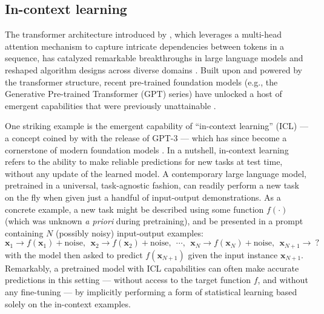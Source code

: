 \documentclass[english]{article}
\begin{document}
\subsection{In-context learning}

The transformer architecture introduced by \citet{vaswani2017attention}, which leverages a multi-head attention mechanism to capture intricate dependencies between tokens in a sequence, has catalyzed remarkable breakthroughs in large language models and reshaped algorithm designs across diverse domains \citep{khan2022transformers,shamshad2023transformers,lin2022survey,gillioz2020overview}.  Built upon and powered by the transformer structure, recent pre-trained foundation models (e.g., the Generative Pre-trained Transformer (GPT) series)  have unlocked a host of emergent capabilities that were previously unattainable  \citep{bommasani2021opportunities}. 


One striking example is the emergent capability of ``in-context learning'' (ICL) --- a concept coined by \cite{brown2020language} with the release of GPT-3 --- which has since become a cornerstone of modern foundation models \citep{dong2022survey}. 
In a nutshell, in-context learning refers to the ability to make reliable predictions for new tasks at test time,  without any update of the learned model. A contemporary large language model, pretrained in a universal, task-agnostic fashion, can readily perform a new task on the fly when given just a handful of input-output demonstrations.  As a concrete example, a new task might be described using some function $f(\cdot)$ (which was unknown {\em a priori} during pretraining), and be presented in a prompt containing $N$ (possibly noisy) input-output examples:  
%
\[
\bm{x}_1 \rightarrow f(\bm{x}_1) + \text{noise}, ~~\bm{x}_2 \rightarrow f(\bm{x}_2) + \text{noise}, 
~~\cdots,~~
\bm{x}_{N} \rightarrow f(\bm{x}_{N}) + \text{noise}, ~~
\bm{x}_{N+1} \rightarrow ~?
\]
%
with the model then asked to predict $f(\bm{x}_{N+1})$ given the input instance $\bm{x}_{N+1}$. 
Remarkably, a pretrained model with ICL capabilities can often make accurate predictions in this setting --- without access to the target function $f$, and without any fine-tuning --- by implicitly performing a form of statistical learning based solely on the in-context examples.









 
\end{document}
